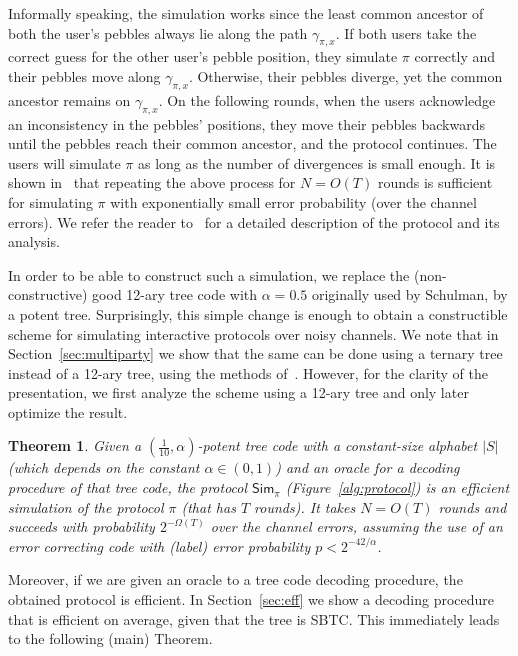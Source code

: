 \documentclass[ letterpaper, 11pt]{article}
\newtheorem{theorem}{Theorem}[section]
\newcommand{\potent}{potent\xspace}
\newcommand{\Sim}{{\mathsf{Sim}_\pi}}
\newcommand{\KTC}{\textsf{SBTC}\xspace}
\begin{document}
Informally speaking, the simulation works since the least common ancestor  of
both the user's pebbles always lie along the path $\gamma_{\pi,x}$. If both users take the
correct guess for the other user's pebble position, they simulate $\pi$ correctly and their pebbles move along $\gamma_{\pi,x}$.
Otherwise, their pebbles diverge, yet the common ancestor remains on $\gamma_{\pi,x}$.
On the following rounds, when the users acknowledge an inconsistency in the pebbles' positions,
they move their pebbles backwards until the pebbles reach their common ancestor, and
the protocol continues.  The users will simulate $\pi$ as long as the number of
divergences is small enough.
It is shown in~\cite{schulman96} that repeating the above process for
$N=O(T)$ rounds is sufficient for simulating
$\pi$ with exponentially small error probability (over the
channel errors).
We refer the reader to~\cite{schulman96}
for a detailed description of the protocol and its analysis.



In order to be able to construct such
a simulation, we replace the (non-constructive)
good 12-ary tree code with $\alpha=0.5$ originally used by Schulman, by a
\potent tree.
Surprisingly, this simple change is enough to obtain a constructible scheme
for simulating interactive protocols over noisy channels.
We note that in Section~\ref{sec:multiparty} we show that the same can be done using a ternary tree
instead of a 12-ary tree, using the methods of~\cite{RS94}. However, for the clarity of the
presentation, we first analyze the scheme using  a 12-ary tree
and only later optimize the result.



\begin{theorem}\label{thm:mainA}
Given a $(\frac{1}{10},\alpha)$-\potent tree code with a constant-size alphabet $|S|$
(which depends on the constant $ \alpha\in (0,1)$)
and an oracle for a decoding procedure of that tree code,
the protocol $\Sim$ (Figure~\ref{alg:protocol})
is an efficient simulation of the protocol $\pi$ (that has $T$ rounds).
It takes $N=O(T)$ rounds and succeeds with probability $2^{-\Omega(T)}$ over the channel errors,
assuming the use of an error correcting code with (label) error probability $p<2^{-42/\alpha}$.
\end{theorem}

Moreover,
if we are given an oracle to a tree code decoding procedure, the obtained protocol
is efficient. In Section~\ref{sec:eff} we show a decoding procedure
that is efficient  on average, given that the tree is \KTC. This immediately
leads to the following (main) Theorem.
\end{document}
